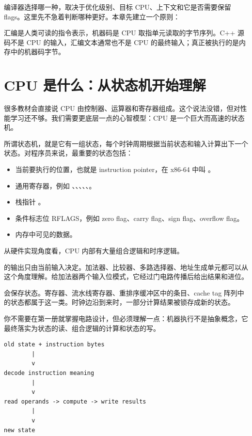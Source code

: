 编译器选择哪一种，取决于优化级别、目标 CPU、上下文和它是否需要保留 flags。这里先不急着判断哪种更好。本章先建立一个原则：

\begin{mentalmodel}
汇编是人类可读的指令表示，机器码是 CPU 取指单元读取的字节序列。C++ 源码不是 CPU 的输入，汇编文本通常也不是 CPU 的最终输入；真正被执行的是内存中的机器码字节。
\end{mentalmodel}

\section{CPU 是什么：从状态机开始理解}

很多教材会直接说 CPU 由控制器、运算器和寄存器组成。这个说法没错，但对性能学习还不够。我们需要更底层一点的心智模型：CPU 是一个巨大而高速的状态机。

所谓状态机，就是它有一组状态，每个时钟周期根据当前状态和输入计算出下一个状态。对程序员来说，最重要的状态包括：

\begin{itemize}
  \item 当前要执行的位置，也就是 instruction pointer，在 x86-64 中叫 。
  \item 通用寄存器，例如 、、、、、。
  \item 栈指针 。
  \item 条件标志位 RFLAGS，例如 zero flag、carry flag、sign flag、overflow flag。
  \item 内存中可见的数据。
\end{itemize}

从硬件实现角度看，CPU 内部有大量组合逻辑和时序逻辑。

 的输出只由当前输入决定。加法器、比较器、多路选择器、地址生成单元都可以从这个角度理解。给加法器两个输入位模式，它经过门电路传播后给出结果和进位。

 会保存状态。寄存器、流水线寄存器、重排序缓冲区中的条目、cache tag 阵列中的状态都属于这一类。时钟边沿到来时，一部分计算结果被锁存成新的状态。

你不需要在第一册就掌握电路设计，但必须理解一点：机器执行不是抽象概念，它最终落实为状态的读、组合逻辑的计算和状态的写。

\begin{center}
\begin{minipage}{0.82\linewidth}
\begin{verbatim}
old state + instruction bytes
        |
        v
decode instruction meaning
        |
        v
read operands -> compute -> write results
        |
        v
new state
\end{verbatim}
\end{minipage}
\end{center}


